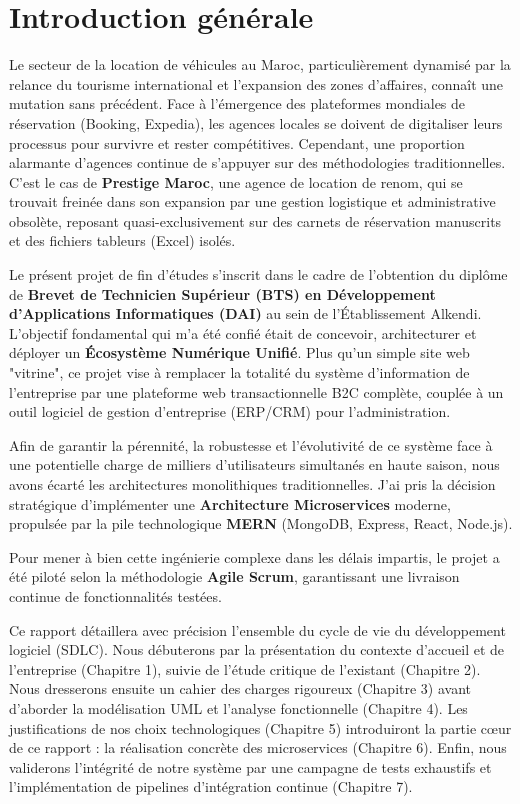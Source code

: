 \chapter*{Introduction générale}

Le secteur de la location de véhicules au Maroc, particulièrement dynamisé par la relance du tourisme international et l'expansion des zones d'affaires, connaît une mutation sans précédent. Face à l'émergence des plateformes mondiales de réservation (Booking, Expedia), les agences locales se doivent de digitaliser leurs processus pour survivre et rester compétitives. Cependant, une proportion alarmante d'agences continue de s'appuyer sur des méthodologies traditionnelles. C'est le cas de \textbf{Prestige Maroc}, une agence de location de renom, qui se trouvait freinée dans son expansion par une gestion logistique et administrative obsolète, reposant quasi-exclusivement sur des carnets de réservation manuscrits et des fichiers tableurs (Excel) isolés.

Le présent projet de fin d'études s'inscrit dans le cadre de l'obtention du diplôme de \textbf{Brevet de Technicien Supérieur (BTS) en Développement d'Applications Informatiques (DAI)} au sein de l'Établissement Alkendi. L'objectif fondamental qui m'a été confié était de concevoir, architecturer et déployer un \textbf{Écosystème Numérique Unifié}. Plus qu'un simple site web "vitrine", ce projet vise à remplacer la totalité du système d'information de l'entreprise par une plateforme web transactionnelle B2C complète, couplée à un outil logiciel de gestion d'entreprise (ERP/CRM) pour l'administration.

Afin de garantir la pérennité, la robustesse et l'évolutivité de ce système face à une potentielle charge de milliers d'utilisateurs simultanés en haute saison, nous avons écarté les architectures monolithiques traditionnelles. J'ai pris la décision stratégique d'implémenter une \textbf{Architecture Microservices} moderne, propulsée par la pile technologique \textbf{MERN} (MongoDB, Express, React, Node.js). 

Pour mener à bien cette ingénierie complexe dans les délais impartis, le projet a été piloté selon la méthodologie \textbf{Agile Scrum}, garantissant une livraison continue de fonctionnalités testées.

Ce rapport détaillera avec précision l'ensemble du cycle de vie du développement logiciel (SDLC). Nous débuterons par la présentation du contexte d'accueil et de l'entreprise (Chapitre 1), suivie de l'étude critique de l'existant (Chapitre 2). Nous dresserons ensuite un cahier des charges rigoureux (Chapitre 3) avant d'aborder la modélisation UML et l'analyse fonctionnelle (Chapitre 4). Les justifications de nos choix technologiques (Chapitre 5) introduiront la partie cœur de ce rapport : la réalisation concrète des microservices (Chapitre 6). Enfin, nous validerons l'intégrité de notre système par une campagne de tests exhaustifs et l'implémentation de pipelines d'intégration continue (Chapitre 7).
